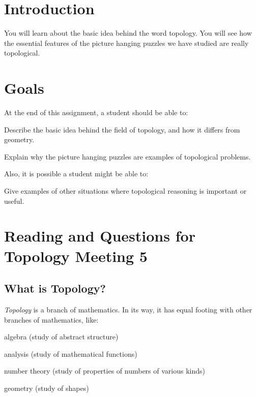 \documentclass[12pt,letterpaper]{article}
\theoremstyle{definition}
\begin{document}
\setlength{\parskip}{1ex plus 0.5ex minus 0.2ex}
\setlength{\parindent}{0pt}

\pagestyle{fancy}
\cfoot{}

\section*{Introduction}
You will learn about the basic idea behind the word topology.
You will see how the essential features of the picture hanging puzzles we have studied are really topological.

\section*{Goals}
At the end of this assignment, a student should be able to:
\begin{compactitem}
\item Describe the basic idea behind the field of topology, and how it differs from geometry.
\item Explain why the picture hanging puzzles are examples of topological problems.
\end{compactitem}
Also, it is possible a student might be able to:
\begin{compactitem}
\item Give examples of other situations where topological reasoning is important or useful.
\end{compactitem}

\section*{Reading and Questions for Topology Meeting 5}

\subsection*{What is Topology?}


\emph{Topology} is a branch of mathematics. In its way, it has equal footing with other branches of mathematics, like:
\begin{compactitem}
\item algebra (study of abstract structure)
\item analysis (study of mathematical functions)
\item number theory (study of properties of numbers of various kinds)
\item geometry (study of shapes)
\end{compactitem}
\end{document}
